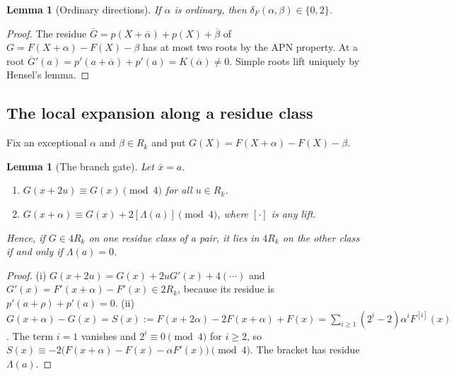 \documentclass[11pt]{article}
\newtheorem{lemma}[theorem]{Lemma}
\theoremstyle{definition}
\theoremstyle{remark}
\newcommand{\ol}[1]{\overline{#1}}
\begin{document}
\begin{lemma}[Ordinary directions]\label{lem:ordinary}
If $\alpha$ is ordinary, then $\delta_F(\alpha,\beta)\in\{0,2\}$.
\end{lemma}
\begin{proof}
The residue $\ol G=p(X+\ol\alpha)+p(X)+\ol\beta$ of $G=F(X+\alpha)-F(X)-\beta$ has at most two roots by the
APN property. At a root $\ol G'(a)=p'(a+\ol\alpha)+p'(a)=K(\ol\alpha)\ne0$. Simple roots lift uniquely by
Hensel's lemma.
\end{proof}

\subsection{The local expansion along a residue class}
Fix an exceptional $\alpha$ and $\beta\in R_k$ and put $G(X)=F(X+\alpha)-F(X)-\beta$.

\begin{lemma}[The branch gate]\label{lem:gate}
Let $\ol x=a$.
\begin{enumerate}[label=(\roman*)]
\item $G(x+2u)\equiv G(x)\pmod 4$ for all $u\in R_k$.
\item $G(x+\alpha)\equiv G(x)+2[\Lambda(a)]\pmod 4$, where $[\cdot]$ is any lift.
\end{enumerate}
Hence, if $G\in4R_k$ on one residue class of a pair, it lies in $4R_k$ on the other class if and only if
$\Lambda(a)=0$.
\end{lemma}
\begin{proof}
(i) $G(x+2u)=G(x)+2uG'(x)+4(\cdots)$ and $G'(x)=F'(x+\alpha)-F'(x)\in2R_k$, because its residue is
$p'(a+\rho)+p'(a)=0$.
(ii) $G(x+\alpha)-G(x)=S(x):=F(x+2\alpha)-2F(x+\alpha)+F(x)=\sum_{i\ge1}(2^i-2)\alpha^iF^{[i]}(x)$. The
term $i=1$ vanishes and $2^i\equiv0\pmod4$ for $i\ge2$, so
$S(x)\equiv-2\bigl(F(x+\alpha)-F(x)-\alpha F'(x)\bigr)\pmod4$. The bracket has residue $\Lambda(a)$.
\end{proof}
\end{document}
